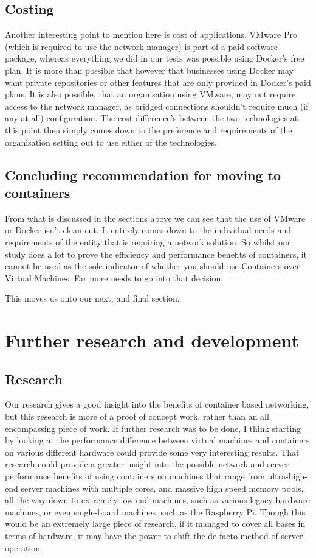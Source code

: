 \subsection{Costing}
Another interesting point to mention here is cost of applications. VMware Pro (which is required to use the network manager) is part of a paid software package, whereas everything we did in our tests was possible using Docker's free plan. It is more than possible that however that businesses using Docker may want private repositories or other features that are only provided in Docker's paid plans. It is also possible, that an organisation using VMware, may not require access to the network manager, as bridged connections shouldn't require much (if any at all) configuration. The cost difference's between the two technologies at this point then simply comes down to the preference and requirements of the organisation setting out to use either of the technologies.

\subsection{Concluding recommendation for moving to containers}
From what is discussed in the sections above we can see that the use of VMware or Docker isn't clean-cut. It entirely comes down to the individual needs and requirements of the entity that is requiring a network solution. So whilst our study does a lot to prove the efficiency and performance benefits of containers, it cannot be used as the sole indicator of whether you should use Containers over Virtual Machines. Far more needs to go into that decision.

This moves us onto our next, and final section.

\section{Further research and development}

\subsection{Research}
Our research gives a good insight into the benefits of container based networking, but this research is more of a proof of concept work, rather than an all encompassing piece of work. If further research was to be done, I think starting by looking at the performance difference between virtual machines and containers on various different hardware could provide some very interesting results. That research could provide a greater insight into the possible network and server performance benefits of using containers on machines that range from ultra-high-end server machines with multiple cores, and massive high speed memory pools, all the way down to extremely low-end machines, such as various legacy hardware machines, or even single-board machines, such as the Raspberry Pi. Though this would be an extremely large piece of research, if it managed to cover all bases in terms of hardware, it may have the power to shift the de-facto method of server operation.

